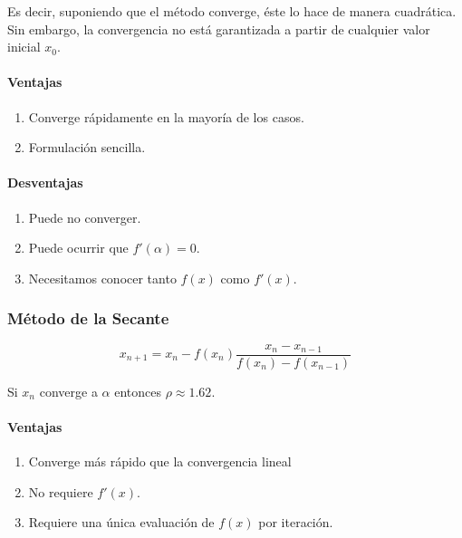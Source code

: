 Es decir, suponiendo que el método converge, éste lo hace de manera
cuadrática. Sin embargo, la convergencia no está garantizada a partir de
cualquier valor inicial \(x_0\).

\hypertarget{ventajas-1}{%
\paragraph{Ventajas}\label{ventajas-1}}

\begin{enumerate}
\def\labelenumi{\arabic{enumi}.}
\tightlist
\item
  Converge rápidamente en la mayoría de los casos.
\item
  Formulación sencilla.
\end{enumerate}

\hypertarget{desventajas}{%
\paragraph{Desventajas}\label{desventajas}}

\begin{enumerate}
\def\labelenumi{\arabic{enumi}.}
\tightlist
\item
  Puede no converger.
\item
  Puede ocurrir que \(f'(\alpha) = 0\).
\item
  Necesitamos conocer tanto \(f(x)\) como \(f'(x)\).
\end{enumerate}

\hypertarget{muxe9todo-de-la-secante}{%
\subsubsection{Método de la Secante}\label{muxe9todo-de-la-secante}}

\[
x_{n+1} = x_n - f(x_n)\frac{x_n - x_{n-1}}{f(x_n) - f(x_{n-1})}
\]

Si \(x_n\) converge a \(\alpha\) entonces \(\rho \approx 1.62\).

\hypertarget{ventajas-2}{%
\paragraph{Ventajas}\label{ventajas-2}}

\begin{enumerate}
\def\labelenumi{\arabic{enumi}.}
\tightlist
\item
  Converge más rápido que la convergencia lineal
\item
  No requiere \(f'(x)\).
\item
  Requiere una única evaluación de \(f(x)\) por iteración.
\end{enumerate}

